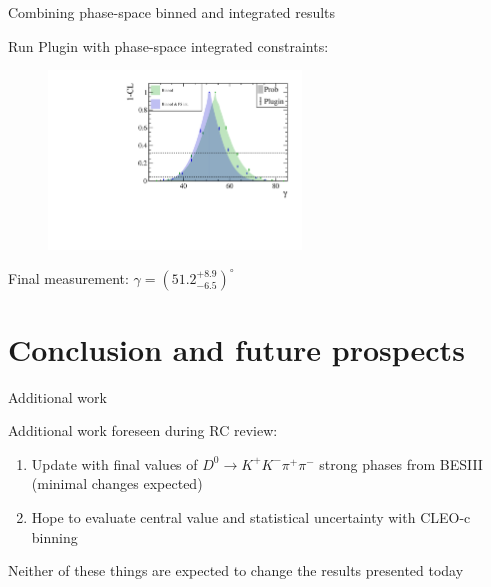 \documentclass[xcolor={dvipsnames}]{beamer}
\begin{document}
\begin{frame}{Combining phase-space binned and integrated results}
  \begin{center}
    Run Plugin with phase-space integrated constraints:
  \end{center}
  \begin{figure}
    \centering
    \includegraphics[width=0.6\textwidth]{Plots/gamma_plugin_scan_GLW.pdf}
  \end{figure}
  \vspace{-0.3cm}
  \begin{center}
    Final measurement: $\gamma = (51.2_{-6.5}^{+8.9})^\circ$ \\
  \end{center}
\end{frame}

\section{Conclusion and future prospects}
\begin{frame}{Additional work}
  \begin{center}
    {\Large Additional work foreseen during RC review:}
  \end{center}
  \begin{enumerate}
    \setlength\itemsep{2.0em}
    \item{Update with final values of $D^0\to K^+K^-\pi^+\pi^-$ strong phases from BESIII (minimal changes expected)}
    \item{Hope to evaluate central value and statistical uncertainty with CLEO-c binning}
  \end{enumerate}
  \vspace{0.4cm}
  \begin{center}
    {\Large Neither of these things are expected to change the results presented today}
  \end{center}
\end{frame}
\end{document}
